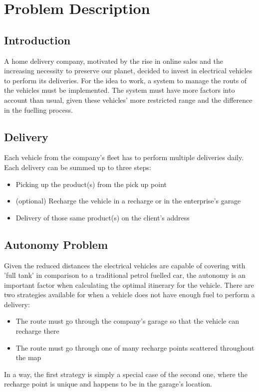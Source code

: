 \chapter{Problem Description}


\section{Introduction}
A home delivery company, motivated by the rise in online sales and the increasing necessity to preserve our planet, decided to invest in electrical vehicles to perform its deliveries. For the idea to work, a system to manage the routs of the vehicles must be implemented. The system must have more factors into account than usual, given these vehicles' more restricted range and the difference in the fuelling process.


\section{Delivery}
Each vehicle from the company's fleet has to perform multiple deliveries daily. Each delivery can be summed up to three steps:
\begin{itemize}
	\item Picking up the product(s) from the pick up point
	\item (optional) Recharge the vehicle in a recharge  or in the enterprise's garage
	\item Delivery of those same product(s) on the client's address
\end{itemize}


\section{Autonomy Problem}
Given the reduced distances the electrical vehicles are capable of covering with 'full tank' in comparison to a traditional petrol fuelled car, the autonomy is an important factor when calculating the optimal itinerary for the vehicle. There are two strategies available for when a vehicle does not have enough fuel to perform a delivery:
\begin{itemize}
    \item The route must go through the company's  garage so that the vehicle can recharge there
    \item The route must go through one of many recharge points scattered throughout the map
\end{itemize}
In a way, the first strategy is simply a special case of the second one, where the recharge point is unique and happens to be in the garage's location.


